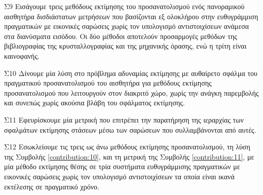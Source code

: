 \begin{bw_box}
\begin{customcontribution}{Σ9}
  \label{contribution:09}
  Εισάγουμε τρεις μεθόδους εκτίμησης του προσανατολισμού ενός πανοραμικού
  αισθητήρα δισδιάστατων μετρήσεων που βασίζονται εξ ολοκλήρου στην
  ευθυγράμμιση πραγματικών με εικονικές σαρώσεις χωρίς τον υπολογισμό
  αντιστοιχίσεων ανάμεσα στα διανύσματα εισόδου. Οι δύο μέθοδοι αποτελούν
  προσαρμογές μεθόδων της βιβλιογραφίας της κρυσταλλογραφίας και της
  μηχανικής όρασης, ενώ η τρίτη είναι καινοφανής.
\end{customcontribution}
\end{bw_box}

\begin{bw_box}
\begin{customcontribution}{Σ10}
  \label{contribution:10}
  Δίνουμε μία λύση στο πρόβλημα αδυναμίας εκτίμησης με αυθαίρετο σφάλμα του
  πραγματικού προσανατολισμού του αισθητήρα για μεθόδους εκτίμησης
  προσανατολισμού που λειτουργούν στον διακριτό χώρο, χωρίς την ανάγκη
  παρεμβολής και συνεπώς χωρίς ακούσια βλάβη του σφάλματος εκτίμησης.
\end{customcontribution}
\end{bw_box}

\begin{bw_box}
\begin{customcontribution}{Σ11}
  \label{contribution:11}
  Εφευρίσκουμε μία μετρική που επιτρέπει την παρατήρηση της ιεραρχίας των
  σφαλμάτων εκτίμησης στάσεων μέσω των σαρώσεων που συλλαμβάνονται από αυτές.
\end{customcontribution}
\end{bw_box}

\begin{bw_box}
\begin{customcontribution}{Σ12}
  \label{contribution:12}
  Εσωκλείουμε τις τρεις ως άνω μεθόδους εκτίμησης προσανατολισμού, τη λύση της
  Συμβολής \ref{contribution:10}, και τη μετρική της Συμβολής
  \ref{contribution:11}, με μία μέθοδο εκτίμησης θέσης σε τρία συστήματα
  ευθυγράμμισης πραγματικών με εικονικές σαρώσεις χωρίς τον υπολογισμό
  αντιστοιχίσεων τα οποία είναι ικανά εκτέλεσης σε πραγματικό χρόνο.
\end{customcontribution}
\end{bw_box}

